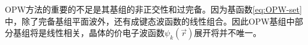 OPW方法的重要的不足是其基组的非正交性和过完备。因为基函数\eqref{eq:OPW-set}中，除了完备基组平面波外，还有成键态波函数的线性组合。因此OPW基组中部分基组将是线性相关，晶体的价电子波函数$\psi_k(\vec r)$展开将并不唯一。%




